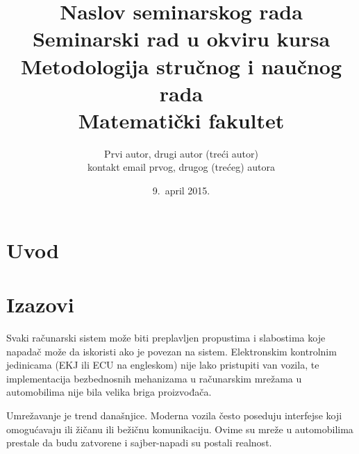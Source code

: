 \documentclass[a4paper]{article}
\newtheorem{primer}{Primer}[section]
\begin{document}
\title{Naslov seminarskog rada\\ \small{Seminarski rad u okviru kursa\\Metodologija stručnog i naučnog rada\\ Matematički fakultet}}

\author{Prvi autor, drugi autor (treći autor)\\ kontakt email prvog, drugog (trećeg) autora}
\date{9.~april 2015.}
\maketitle


\tableofcontents

\newpage

\section{Uvod}
\label{sec:uvod}








\section{Izazovi}
\label{sec:izazovi}
\cite{6615528}

Svaki računarski sistem može biti preplavljen propustima i slabostima koje napadač može da iskoristi ako je povezan na sistem. Elektronskim kontrolnim jedinicama (EKJ ili ECU na engleskom) nije lako pristupiti van vozila, te implementacija bezbednosnih mehanizama u računarskim mrežama u automobilima nije bila velika briga proizvođača.

Umrežavanje je trend današnjice. Moderna vozila često poseduju interfejse koji omogućavaju ili žičanu ili bežičnu komunikaciju. Ovime su mreže u automobilima prestale da budu zatvorene i sajber-napadi su postali realnost.
\end{document}
